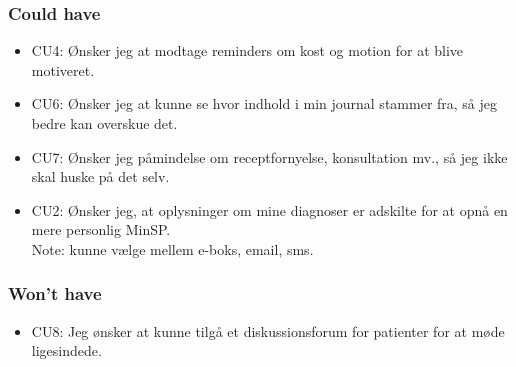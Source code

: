 \subsubsection*{Could have}
\begin{itemize}
\item CU4: Ønsker jeg at modtage reminders om kost og motion for at blive motiveret.
\item CU6: Ønsker jeg at kunne se hvor indhold i min journal stammer fra, så jeg bedre kan overskue det.
\item CU7: Ønsker jeg påmindelse om receptfornyelse, konsultation mv., så jeg ikke skal huske på det selv.
\item CU2: Ønsker jeg, at oplysninger om mine diagnoser er adskilte for at opnå en mere personlig MinSP.\\
Note: kunne vælge mellem e-boks, email, sms.
\end{itemize}
\subsubsection*{Won't have}
\begin{itemize}
\item CU8: Jeg ønsker at kunne tilgå et diskussionsforum for patienter for at møde ligesindede.
\end{itemize}
